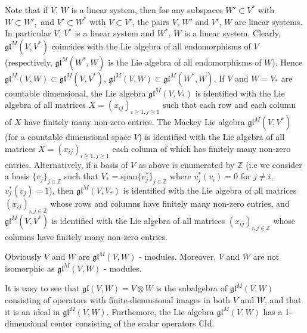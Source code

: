 \documentclass[10pt]{amsart}
\newcommand {\ZZ} {\mathbb {Z}}
\newcommand {\CC} {\mathbb {C}}
\newcommand{\id}{\mathrm{Id}}
\renewcommand{\span}{\mathrm{span}}
\newcommand{\gl}{\mathfrak{gl}}
\begin{document}
Note that if $V,\,W$ is a linear system, then for any subspaces $W' \subset V^*$ with $W \subset W',$ and $V' \subset W^*$ with $V \subset V'$, the pairs $V,\,W'$ 
and $V',\,W$ are linear systems. In particular $V,\,V^*$ is a linear system and $W^*,\,W$ is a linear system. Clearly, $\gl^M(V,V^*)$ coincides with the Lie 
algebra of all endomorphisms of $V$ (respectively, $\gl^M(W^*,W)$ is the Lie algebra of all endomorphisms of $W$). Hence 
$\gl^M(V,W) \subset \gl^M(V,V^*)$, $\gl^M(V,W) \subset \gl^M(W^*,W)$.
If $V$ and $W = V_*$ are countable dimensional, the Lie algebra $\gl^M(V,V_*)$ is identified 
with the Lie algebra of all matrices $X=(x_{ij})_{i\geq 1, j\geq 1}$ such that each row and each column of $X$ have finitely many non-zero entries. 
The Mackey Lie algebra  $\gl^M(V,V^*)$
(for a countable dimensional space $V$) is identified with the Lie algebra of all matrices $X=(x_{ij})_{i\geq 1, j\geq 1}$ each column of which has finitely 
many non-zero entries. Alternatively, 
if a basis of $V$ as above is enumerated by $\ZZ$ (i.e we consider a basis $\lbrace v_j\rbrace_{j \in \ZZ}$ 
such that $V_* = \span \lbrace v^*_j \rbrace_{j \in \ZZ}$ 
where $v^*_j(v_i) = 0$ for $j \neq i$, $v_j^*(v_j)=1$), then  $\gl^M(V,V_*)$ is identified with the Lie algebra of all matrices $(x_{ij})_{i,j \in \ZZ}$ whose rows and 
columns have finitely many non-zero entries, and  $\gl^M(V,V^*)$ is identified with the Lie algebra of all matrices $(x_{ij})_{i,j\in \ZZ}$ whose columns have finitely 
many non-zero entries.

Obviously $V$ and $W$ are  $\gl^M(V,W)$ - modules. Moreover, $V$ and $W$ are not isomorphic as  $\gl^M(V,W)$ - modules.

It is easy to see that $\gl(V,W) = V \otimes W$ is the subalgebra of $\gl^M(V,W)$ consisting of operators with finite-diemnsional images in both $V$ and $W$, and that it is an ideal in  $\gl^M(V,W)$. Furthemore, the Lie algebra  $\gl^M(V,W)$ has a 1-dimensional center consisting of 
the scalar operators $\CC \id$.
\end{document}
